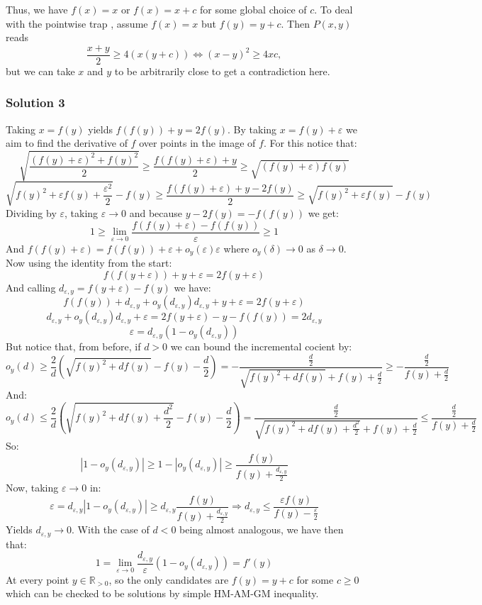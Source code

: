 \documentclass[11pt]{article}
\begin{document}
Thus, we have $f(x) = x$ or $f(x) = x + c$ for some global choice of $c$. To deal with the pointwise trap , assume $f(x) = x$ but $f(y) = y + c$.
Then $P(x, y)$ reads
\[ \frac{x + y}{2} \ge 4(x(y + c))  \Leftrightarrow (x - y)^2 \ge 4xc , \]but we can take $x$ and $y$ to be arbitrarily close to get a contradiction here.

\newpage
\subsubsection{Solution 3}
Taking $x = f(y)$ yields $f(f(y)) + y = 2f(y)$. By taking $x = f(y) + \varepsilon$ we aim to find the derivative of $f$ over points in the image of $f$. For this notice that:
$$\sqrt{\frac{(f(y)+\varepsilon)^2+f(y)^2}{2}} \geq \frac{f(f(y) + \varepsilon)+y}{2} \geq \sqrt{(f(y)+\varepsilon) f(y)}$$$$\sqrt{f(y)^2 + \varepsilon f(y) + \frac{\varepsilon^2}{2}} - f(y) \geq \frac{f(f(y) + \varepsilon)+y - 2f(y)}{2} \geq \sqrt{f(y)^2+\varepsilon f(y)}-f(y)$$Dividing by $\varepsilon$, taking $\varepsilon \to 0$ and because $y - 2f(y) = -f(f(y))$ we get:
$$1 \geq \lim_{\varepsilon \to 0} \frac{f(f(y) + \varepsilon) - f(f(y))}{\varepsilon} \geq 1$$And $f(f(y)+\varepsilon) = f(f(y)) + \varepsilon + o_y(\varepsilon) \varepsilon$ where $o_y(\delta) \to 0$ as $\delta \to 0$. Now using the identity from the start:
$$f(f(y+ \varepsilon)) + y + \varepsilon = 2f(y + \varepsilon)$$And calling $d_{\varepsilon,y} = f(y+\varepsilon) - f(y)$ we have:
$$f(f(y)) + d_{\varepsilon,y} + o_y(d_{\varepsilon,y})d_{\varepsilon,y} + y + \varepsilon = 2f(y + \varepsilon)$$$$d_{\varepsilon,y} + o_y(d_{\varepsilon,y})d_{\varepsilon,y} + \varepsilon = 2 f(y + \varepsilon) - y - f(f(y)) = 2 d_{\varepsilon,y}$$$$\varepsilon = d_{\varepsilon,y} (1 - o_y(d_{\varepsilon,y}))$$But notice that, from before, if $d>0$ we can bound the incremental cocient by:
$$  o_y(d) \geq \frac{2}{d} (\sqrt{f(y)^2+d f(y)} - f(y) - \frac{d}{2} ) = - \frac{ \frac{d}{2}}{\sqrt{f(y)^2+d f(y)} + f(y) + \frac{d}{2}} \geq - \frac{\frac{d}{2}}{f(y) + \frac{d}{2}}$$And:
$$o_y(d) \leq \frac{2}{d}(\sqrt{f(y)^2 + d f(y) + \frac{d^2}{2}} - f(y)  - \frac{d}{2}) =  \frac{\frac{d}{2}}{\sqrt{f(y)^2 + d f(y) + \frac{d^2}{2}} + f(y) + \frac{d}{2}} \leq \frac{\frac{d}{2}}{f(y) + \frac{d}{2}}$$So:
$$|1 - o_y(d_{\varepsilon, y})| \geq 1 - |o_y(d_{\varepsilon, y})| \geq \frac{f(y)}{f(y) + \frac{d_{\varepsilon, y}}{2}}$$Now, taking $\varepsilon \to 0$ in:
$$\varepsilon = d_{\varepsilon,y} |1 - o_y(d_{\varepsilon,y})| \geq  d_{\varepsilon,y} \frac{f(y)}{f(y) + \frac{d_{\varepsilon,y}}{2}} \Rightarrow d_{\varepsilon,y} \leq \frac{\varepsilon f(y)}{f(y) - \frac{\varepsilon}{2}}$$Yields $d_{\varepsilon,y} \to 0$. With the case of $d<0$ being almost analogous, we have then that:
$$1 = \lim_{\varepsilon \to 0}  \frac{d_{\varepsilon,y}}{ \varepsilon} (1 - o_y(d_{\varepsilon,y})) = f'(y)$$At every point $ y \in \mathbb{R}_{>0}$, so the only candidates are $f(y) = y+c$ for some $c \geq 0$ which can be checked to be solutions by simple HM-AM-GM inequality.
\newpage
\end{document}
